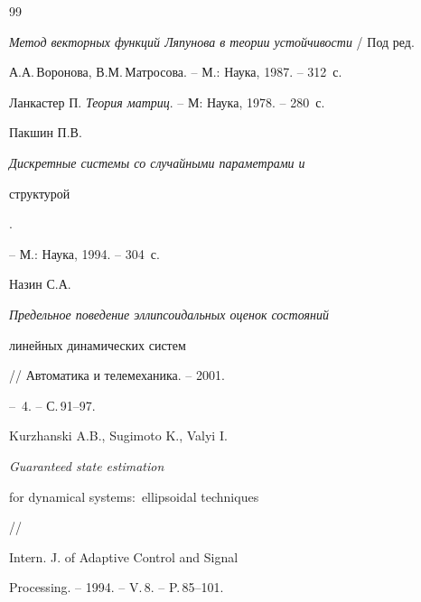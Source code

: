 \begin{thebibliography}{99}


{\em Метод векторных функций Ляпунова в теории устойчивости} / Под ред.


А.А.\,Воронова, В.М.\,Матросова. -- М.: Наука, 1987. -- 312~с.




Ланкастер П. {\em Теория матриц}. -- М: Наука, 1978. -- 280~с.




Пакшин П.В. {\em Дискретные системы со случайными параметрами и


структурой}.


-- М.: Наука, 1994. -- 304~с.




Назин С.А. {\em Предельное поведение эллипсоидальных оценок состояний


линейных динамических систем} // Автоматика и телемеханика. -- 2001.


-- \No\,4. -- С.\,91--97.




Kurzhanski A.B., Sugimoto K., Valyi I. {\em Guaranteed state estimation


for dynamical systems$:$ ellipsoidal techniques} //


Intern. J. of Adaptive Control and Signal


Processing. -- 1994. -- V.\,8. -- P.\,85--101.





\end{thebibliography}





\vskip 2cm














\label{end}





